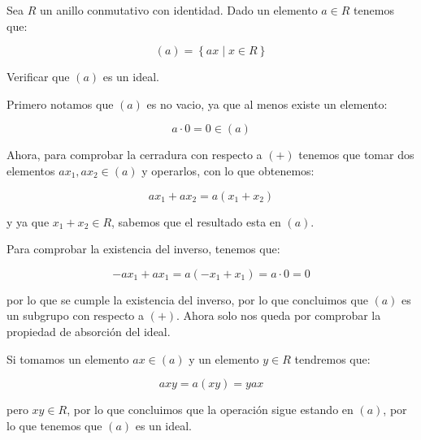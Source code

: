         \begin{ejemplo}
            Sea $R$ un anillo conmutativo con identidad.
            Dado un elemento $a \in R$ tenemos que:

            \begin{equation*}
                (a) = \left\{ ax \mid x \in R \right\}
            \end{equation*}

            Verificar que $(a)$ es un ideal.

            Primero notamos que $(a)$ es no vacio, ya que al menos existe un elemento:

            \begin{equation*}
                a \cdot 0 = 0 \in (a)
            \end{equation*}

            Ahora, para comprobar la cerradura con respecto a $(+)$ tenemos que tomar dos elementos $ax_1, ax_2 \in (a)$ y operarlos, con lo que obtenemos:

            \begin{equation*}
                ax_1 + ax_2 = a(x_1 + x_2)
            \end{equation*}

            y ya que $x_1 + x_2 \in R$, sabemos que el resultado esta en $(a)$.

            Para comprobar la existencia del inverso, tenemos que:

            \begin{equation*}
                -ax_1 + ax_1 = a(-x_1 + x_1) = a \cdot 0 = 0
            \end{equation*}

            por lo que se cumple la existencia del inverso, por lo que concluimos que $(a)$ es un subgrupo con respecto a $(+)$.
            Ahora solo nos queda por comprobar la propiedad de absorción del ideal.

            Si tomamos un elemento $ax \in (a)$ y un elemento $y \in R$ tendremos que:

            \begin{equation*}
                ax y = a(xy) = y ax
            \end{equation*}

            pero $xy \in R$, por lo que concluimos que la operación sigue estando en $(a)$, por lo que tenemos que $(a)$ es un ideal.
        \end{ejemplo}

